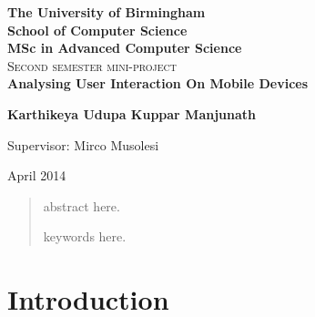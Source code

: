 \documentclass[12pt]{report}
\begin{document}
\begin{titlepage}
\begin{center}
\lstset{language=Java}  
\textbf{\LARGE The University of Birmingham}\\[0.35cm]
\textbf{\LARGE School of Computer Science}\\[0.35cm]
\textbf{\LARGE MSc in Advanced Computer Science}\\[2.5cm]

\textsc{\Large Second semester mini-project}\\[2.5cm]


{ \huge \bfseries  Analysing User Interaction On Mobile Devices \\[1cm] }

{\large \textbf{Karthikeya Udupa Kuppar Manjunath}\\[1cm]}

\large{Supervisor: Mirco Musolesi}


\vfill

{\large April 2014}

\end{center}
\end{titlepage}

\begin{abstract}

abstract here.
\linebreak\linebreak\linebreak\linebreak
\begin{center}
\begin{keywords}
keywords here.
\end{keywords}
\end{center}
\end{abstract}


\tableofcontents
\listoffigures
\listoftables
\newpage

\chapter{Introduction}
\noindent
\end{document}
